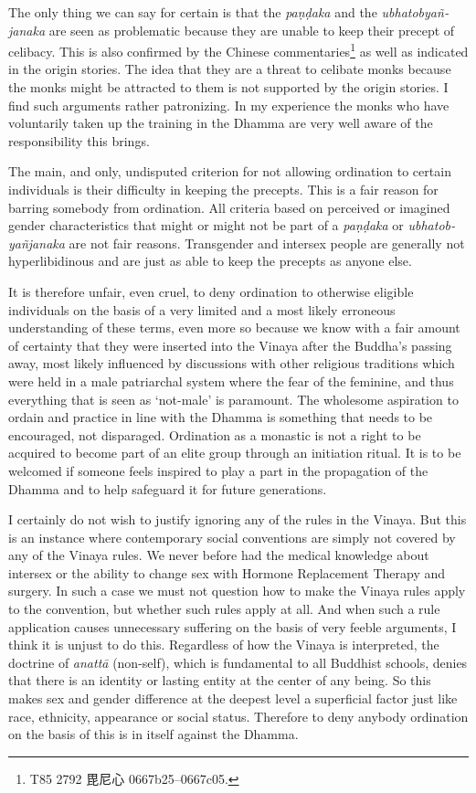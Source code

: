 The only thing we can say for certain is that the {\em paṇḍaka} and the {\em ubhatob­yañ­janaka} are seen as problematic because they are unable to keep their precept of celibacy. This is also confirmed by the Chinese commentaries\footnote{T85 2792 毘尼心 0667b25–0667c05.} as well as indicated in the origin stories. The idea that they are a threat to celibate monks because the monks might be attracted to them is not supported by the origin stories. I find such arguments rather patronizing. In my experience the monks who have voluntarily taken up the training in the Dhamma are very well aware of the responsibility this brings.

The main, and only, undisputed criterion for not allowing ordination to certain individuals is their difficulty in keeping the precepts. This is a fair reason for barring somebody from ordination. All criteria based on perceived or imagined gender characteristics that might or might not be part of a {\em paṇḍaka} or {\em ubhatob­yañ­janaka} are not fair reasons. Transgender and intersex people are generally not hyperlibidinous and are just as able to keep the precepts as anyone else. 

It is therefore unfair, even cruel, to deny ordination to otherwise eligible individuals on the basis of a very limited and a most likely erroneous understanding of these terms, even more so because we know with a fair amount of certainty that they were inserted into the Vinaya after the Buddha's passing away, most likely influenced by discussions with other religious traditions which were held in a male patriarchal system where the fear of the feminine, and thus everything that is seen as `not-male' is paramount. The wholesome aspiration to ordain and practice in line with the Dhamma is something that needs to be encouraged, not disparaged. Ordination as a monastic is not a right to be acquired to become part of an elite group through an initiation ritual. It is to be welcomed if someone feels inspired to play a part in the propagation of the Dhamma and to help safeguard it for future generations. 

I certainly do not wish to justify ignoring any of the rules in the Vinaya. But this is an instance where contemporary social conventions are simply not covered by any of the Vinaya rules. We never before had the medical knowledge about intersex or the ability to change sex with Hormone Replacement Therapy and surgery. In such a case we must not question how to make the Vinaya rules apply to the convention, but whether such rules apply at all. And when such a rule application causes unnecessary suffering on the basis of very feeble arguments, I think it is unjust to do this. Regardless of how the Vinaya is interpreted, the doctrine of {\em anattā} (non-self), which is fundamental to all Buddhist schools, denies that there is an identity or lasting entity at the center of any being. So this makes sex and gender difference at the deepest level a superficial factor just like race, ethnicity, appearance or social status. Therefore to deny anybody ordination on the basis of this is in itself against the Dhamma.

